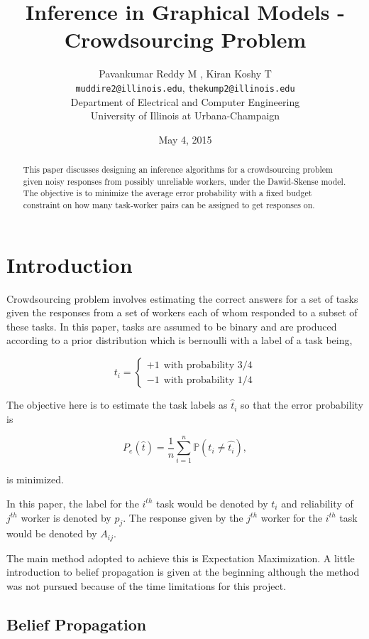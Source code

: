\documentclass[10pt]{article}
\title{Inference in Graphical Models - Crowdsourcing Problem}
\author{
  Pavankumar Reddy M , Kiran Koshy T \\
  {\tt muddire2@illinois.edu}, {\tt thekump2@illinois.edu}  \\
  Department of Electrical and Computer Engineering \\
  University of Illinois at Urbana-Champaign \\}
\date{May 4, 2015}
\begin{document}
\maketitle
\begin{abstract}
  This paper discusses designing an inference algorithms for a crowdsourcing problem given noisy responses from possibly unreliable workers, under the Dawid-Skense model. The objective is to minimize the average error probability with a fixed budget constraint on how many task-worker pairs can be assigned to get responses on.
  
\end{abstract}

\section{Introduction}

Crowdsourcing problem involves estimating the correct answers for a set of tasks given the responses from a set of workers  each of whom responded to a subset of these tasks. In this paper, tasks are assumed to be binary and are produced according to a prior distribution which is bernoulli with a label of a task being,

\begin{equation}
t_i = \left\{
\begin{array}{cc}
+1~~\text{with probability 3/4}\\
-1~~\text{with probability 1/4}
\end{array}
\right. \label{eq:t_prior}
\end{equation}

The objective here is to estimate the task labels as $\hat{t}_i$ so that the error probability is

$$P_e(\hat{t}) = \frac{1}{n}\sum\limits_{i = 1}^{n}\mathbb{P}(t_i\ne \hat{t_i}),$$

is minimized.

In this paper, the label for the $i^{th}$ task would be denoted by $t_i$ and reliability of $j^{th}$ worker is denoted by $p_j$. The response given by the $j^{th}$ worker for the $i^{th}$ task would be denoted by $A_{ij}$.

The main method adopted to achieve this is Expectation Maximization. A little introduction to belief propagation is given at the beginning although the method was not pursued because of the time limitations for this project.

\subsection{Belief Propagation}
\end{document}
